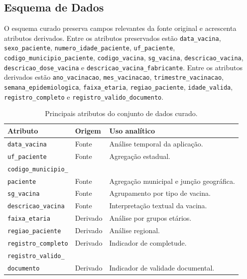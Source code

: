 \documentclass[12pt]{article}
\begin{document}
\subsection{Esquema de Dados}

O esquema curado preserva campos relevantes da fonte original e acrescenta atributos derivados. Entre os atributos preservados estão \texttt{data\_vacina}, \texttt{sexo\_paciente}, \texttt{numero\_idade\_paciente}, \texttt{uf\_paciente}, \texttt{codigo\_municipio\_paciente}, \texttt{codigo\_vacina}, \texttt{sg\_vacina}, \texttt{descricao\_vacina}, \texttt{descricao\_dose\_vacina} e \texttt{descricao\_vacina\_fabricante}. Entre os atributos derivados estão \texttt{ano\_vacinacao}, \texttt{mes\_vacinacao}, \texttt{trimestre\_vacinacao}, \texttt{semana\_epidemiologica}, \texttt{faixa\_etaria}, \texttt{regiao\_paciente}, \texttt{idade\_valida}, \texttt{registro\_completo} e \texttt{registro\_valido\_documento}.

\begin{table}[ht]
\centering
\caption{Principais atributos do conjunto de dados curado.}
\label{tab:main-attributes}
\begin{tabular}{p{4.8cm}p{1.8cm}p{4.9cm}}
\toprule
\textbf{Atributo} & \textbf{Origem} & \textbf{Uso analítico} \\
\midrule
\texttt{data\_vacina} & Fonte & Análise temporal da aplicação. \\
\texttt{uf\_paciente} & Fonte & Agregação estadual. \\
\texttt{codigo\_municipio\_}\\
\texttt{paciente} & Fonte & Agregação municipal e junção geográfica. \\
\texttt{sg\_vacina} & Fonte & Agrupamento por tipo de vacina. \\
\texttt{descricao\_vacina} & Fonte & Interpretação textual da vacina. \\
\texttt{faixa\_etaria} & Derivado & Análise por grupos etários. \\
\texttt{regiao\_paciente} & Derivado & Análise regional. \\
\texttt{registro\_completo} & Derivado & Indicador de completude. \\
\texttt{registro\_valido\_}\\
\texttt{documento} & Derivado & Indicador de validade documental. \\
\bottomrule
\end{tabular}
\end{table}
\end{document}
